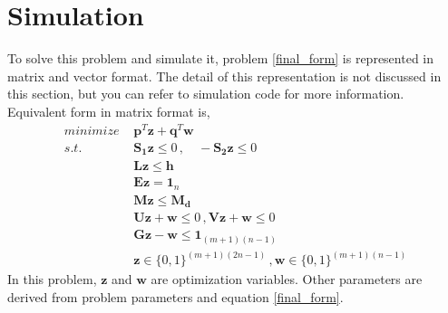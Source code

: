 \documentclass[lettersize,journal]{IEEEtran}
\begin{document}
\section{Simulation}
To solve this problem and simulate it, problem \ref{final_form} is represented in matrix and vector format. The detail of this representation is not discussed in this section, but you can refer to simulation code for more information. Equivalent form in matrix format is,
\begin{align}
\label{matrix_form}
minimize \, \, & \boldsymbol{p}^T \boldsymbol{z} + \boldsymbol{q}^T \boldsymbol{w} \\
s.t.  \, \, & \boldsymbol{S_1} \boldsymbol{z} \leq 0 \, , \quad -\boldsymbol{S_2} \boldsymbol{z} \leq 0 \nonumber \\
\quad & \boldsymbol{L}\boldsymbol{z} \leq \boldsymbol{h} \nonumber \\
\quad &  \boldsymbol{E} \boldsymbol{z} = \boldsymbol{1}_{n}  \nonumber \\
\quad &  \boldsymbol{M} \boldsymbol{z} \leq \boldsymbol{M_d} \nonumber \\
\quad &  \boldsymbol{U} \boldsymbol{z} + \boldsymbol{w} \leq 0 \, , \boldsymbol{V} \boldsymbol{z} + \boldsymbol{w} \leq 0 \nonumber \\
\quad &  \boldsymbol{G} \boldsymbol{z} - \boldsymbol{w} \leq \boldsymbol{1}_{(m+1)(n-1)} \nonumber \\
\quad &  \boldsymbol{z} \in \{0, 1\}^{(m+1)(2n-1)} \, , \boldsymbol{w} \in \{0, 1\}^{(m+1)(n-1)} \nonumber
\end{align}
In this problem, $\boldsymbol{z}$ and $\boldsymbol{w}$ are optimization variables. Other parameters are derived from problem parameters and equation \ref{final_form}. 
\end{document}
